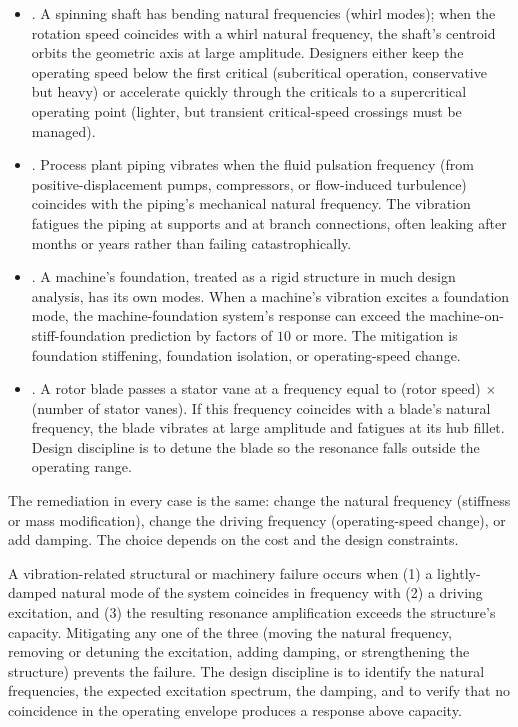 \begin{itemize}[leftmargin=*]
  \item {}. A spinning
    shaft has bending natural frequencies (whirl modes); when the
    rotation speed coincides with a whirl natural frequency, the
    shaft's centroid orbits the geometric axis at large amplitude.
    Designers either keep the operating speed below the first
    critical (subcritical operation, conservative but heavy) or
    accelerate quickly through the criticals to a supercritical
    operating point (lighter, but transient critical-speed crossings
    must be managed).
  \item {}. Process plant piping vibrates
    when the fluid pulsation frequency (from positive-displacement
    pumps, compressors, or flow-induced turbulence) coincides with
    the piping's mechanical natural frequency. The vibration
    fatigues the piping at supports and at branch connections, often
    leaking after months or years rather than failing catastrophically.
  \item {}. A machine's foundation,
    treated as a rigid structure in much design analysis, has its
    own modes. When a machine's vibration excites a foundation mode,
    the machine-foundation system's response can exceed the
    machine-on-stiff-foundation prediction by factors of $10$ or
    more. The mitigation is foundation stiffening, foundation
    isolation, or operating-speed change.
  \item {}. A rotor
    blade passes a stator vane at a frequency equal to (rotor speed)
    $\times$ (number of stator vanes). If this frequency coincides
    with a blade's natural frequency, the blade vibrates at large
    amplitude and fatigues at its hub fillet. Design discipline is
    to detune the blade so the resonance falls outside the operating
    range.
\end{itemize}

The remediation in every case is the same: change the natural
frequency (stiffness or mass modification), change the driving
frequency (operating-speed change), or add damping. The choice
depends on the cost and the design constraints.

\begin{principle}
A vibration-related structural or machinery failure occurs when (1)
a lightly-damped natural mode of the system coincides in frequency
with (2) a driving excitation, and (3) the resulting resonance
amplification exceeds the structure's capacity. Mitigating any one
of the three (moving the natural frequency, removing or detuning
the excitation, adding damping, or strengthening the structure)
prevents the failure. The design discipline is to identify the
natural frequencies, the expected excitation spectrum, the damping,
and to verify that no coincidence in the operating envelope
produces a response above capacity.
\end{principle}


